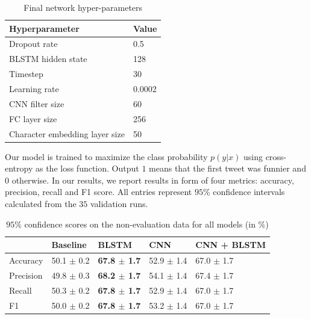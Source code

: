 \documentclass[10pt, a4paper]{article}
\begin{document}
\begin{table}
\small
\caption{Final network hyper-parameters}
 \label{tab:hyperparams}
 \begin{center}
 \begin{tabular}{ll}
 \toprule
     Hyperparameter & Value\\
 \midrule
     Dropout rate & 0.5\\
     BLSTM hidden state & 128\\
     Timestep & 30\\
     Learning rate & 0.0002\\
     CNN filter size & 60 \\
     FC layer size & 256\\
     Character embedding layer size & 50\\
 \bottomrule
 \end{tabular}
 \end{center}
\end{table}

Our model is trained to maximize the class probability $p(y \vert x)$ using
cross-entropy as the loss function. Output $1$ means that the first tweet was
funnier and $0$ otherwise.
In our results, we report results in form of
four metrics: accuracy, precision, recall and F1 score. All entries represent
$95\%$ confidence intervals calculated from the $35$ validation runs.

\begin{table}
\scriptsize
    \caption{$95\%$ confidence scores on the non-evaluation data for all models
    (in $\%$)}
 \label{tab:conf_95_dev}
 \begin{center}
 \begin{tabular}{l|llll}
 \toprule
     & Baseline & BLSTM & CNN & CNN + BLSTM\\
 \midrule
     Accuracy & 50.1 $\pm$ 0.2 & \textbf{67.8 $\pm$ 1.7} & 52.9 $\pm$ 1.4  & 67.0 $\pm$
     1.7\\

     Precision & 49.8 $\pm$ 0.3 & \textbf{68.2 $\pm$ 1.7}  & 54.1 $\pm$ 1.4& 67.4 $\pm$ 1.7\\

     Recall & 50.3 $\pm$ 0.2 & \textbf{67.8 $\pm$ 1.7} & 52.9 $\pm$ 1.4& 67.0 $\pm$ 1.7\\

     F1 & 50.0 $\pm$ 0.2 & \textbf{67.8 $\pm$ 1.7}  & 53.2 $\pm$ 1.4 & 67.0 $\pm$ 1.7\\

 \bottomrule
 \end{tabular}
 \end{center}
\end{table}
\end{document}
